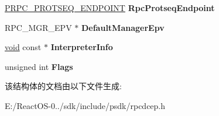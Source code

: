 \begin{DoxyCompactItemize}
\hyperlink{struct___r_p_c___p_r_o_t_s_e_q___e_n_d_p_o_i_n_t}{P\+R\+P\+C\+\_\+\+P\+R\+O\+T\+S\+E\+Q\+\_\+\+E\+N\+D\+P\+O\+I\+NT} {\bfseries Rpc\+Protseq\+Endpoint}
\item 
\mbox{\label{struct___r_p_c___s_e_r_v_e_r___i_n_t_e_r_f_a_c_e_a6ce0b55ae900a400486f27a64cd2643b}} 
R\+P\+C\+\_\+\+M\+G\+R\+\_\+\+E\+PV $\ast$ {\bfseries Default\+Manager\+Epv}
\item 
\mbox{\label{struct___r_p_c___s_e_r_v_e_r___i_n_t_e_r_f_a_c_e_af14f5c6817f7e74cbde317396b19e67e}} 
\hyperlink{interfacevoid}{void} const  $\ast$ {\bfseries Interpreter\+Info}
\item 
\mbox{\label{struct___r_p_c___s_e_r_v_e_r___i_n_t_e_r_f_a_c_e_a168fa81200f21a2dae61b1f6545d6317}} 
unsigned int {\bfseries Flags}
\end{DoxyCompactItemize}


该结构体的文档由以下文件生成\+:\begin{DoxyCompactItemize}
\item 
E\+:/\+React\+O\+S-\/0../sdk/include/psdk/rpcdcep.\+h\end{DoxyCompactItemize}
